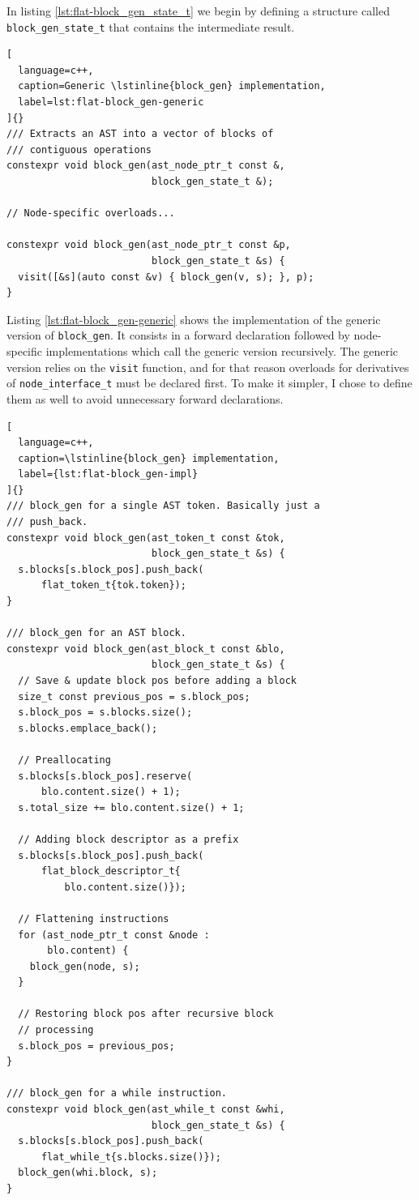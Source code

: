\documentclass[../main]{subfiles}
\begin{document}
In listing \ref{lst:flat-block_gen_state_t} we begin by defining a structure
called \lstinline{block_gen_state_t} that contains the intermediate result.

\begin{lstlisting}[
  language=c++,
  caption=Generic \lstinline{block_gen} implementation,
  label=lst:flat-block_gen-generic
]{}
/// Extracts an AST into a vector of blocks of
/// contiguous operations
constexpr void block_gen(ast_node_ptr_t const &,
                         block_gen_state_t &);

// Node-specific overloads...

constexpr void block_gen(ast_node_ptr_t const &p,
                         block_gen_state_t &s) {
  visit([&s](auto const &v) { block_gen(v, s); }, p);
}
\end{lstlisting}

Listing \ref{lst:flat-block_gen-generic} shows the implementation of the generic
version of \lstinline{block_gen}. It consists in a forward declaration
followed by node-specific implementations which call the generic version
recursively. The generic version relies on the \lstinline{visit} function,
and for that reason overloads for derivatives of \lstinline{node_interface_t}
must be declared first. To make it simpler, I chose to define them as well
to avoid unnecessary forward declarations.

\begin{lstlisting}[
  language=c++,
  caption=\lstinline{block_gen} implementation,
  label={lst:flat-block_gen-impl}
]{}
/// block_gen for a single AST token. Basically just a
/// push_back.
constexpr void block_gen(ast_token_t const &tok,
                         block_gen_state_t &s) {
  s.blocks[s.block_pos].push_back(
      flat_token_t{tok.token});
}

/// block_gen for an AST block.
constexpr void block_gen(ast_block_t const &blo,
                         block_gen_state_t &s) {
  // Save & update block pos before adding a block
  size_t const previous_pos = s.block_pos;
  s.block_pos = s.blocks.size();
  s.blocks.emplace_back();

  // Preallocating
  s.blocks[s.block_pos].reserve(
      blo.content.size() + 1);
  s.total_size += blo.content.size() + 1;

  // Adding block descriptor as a prefix
  s.blocks[s.block_pos].push_back(
      flat_block_descriptor_t{
          blo.content.size()});

  // Flattening instructions
  for (ast_node_ptr_t const &node :
       blo.content) {
    block_gen(node, s);
  }

  // Restoring block pos after recursive block
  // processing
  s.block_pos = previous_pos;
}

/// block_gen for a while instruction.
constexpr void block_gen(ast_while_t const &whi,
                         block_gen_state_t &s) {
  s.blocks[s.block_pos].push_back(
      flat_while_t{s.blocks.size()});
  block_gen(whi.block, s);
}
\end{lstlisting}
\end{document}
